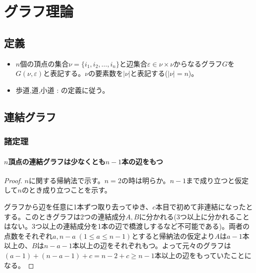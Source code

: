 \part{グラフ理論}
	\chapter{定義}
		\begin{itemize}
			\item $n$個の頂点の集合$\nu=\{i_1,i_2,\dotsc,i_n\}$と辺集合$\varepsilon\in\nu\times\nu$からなるグラフ$G$を$G(\nu,\varepsilon)$と表記する。$\nu$の要素数を$|\nu|$と表記する($|\nu|=n$)。
			\item 歩道,道,小道 : \cite{離散数学}の定義に従う。
		\end{itemize}
	\chapter{連結グラフ}
		\section{諸定理}
			\subsection{\texorpdfstring{$n$}{n}頂点の連結グラフは少なくとも\texorpdfstring{$n-1$}{n-1}本の辺をもつ}
				\begin{proof}
				\quad\par
					$n$に関する帰納法で示す。$n=2$の時は明らか。$n-1$まで成り立つと仮定して$n$のとき成り立つことを示す。
					\par
					グラフから辺を任意に1本ずつ取り去ってゆき、$c$本目で初めて非連結になったとする。このときグラフは2つの連結成分$A,B$に分かれる(3つ以上に分かれることはない。3つ以上の連結成分を1本の辺で橋渡しするなど不可能である)。両者の点数をそれぞれ$a,n-a\;(1\leq a\leq n-1)$とすると帰納法の仮定より$A$は$a-1$本以上の、$B$は$n-a-1$本以上の辺をそれぞれもつ。よって元々のグラフは$(a-1)+(n-a-1)+c = n-2+c \geq n-1$本以上の辺をもっていたことになる。
				\end{proof}
